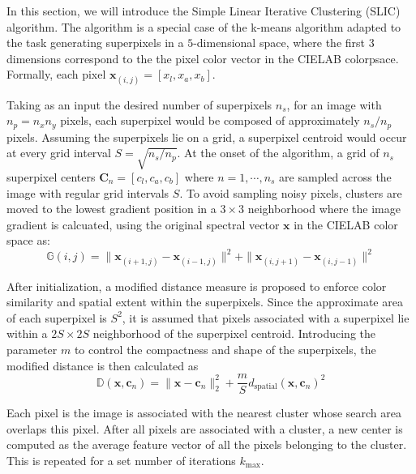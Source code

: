 In this section, we will introduce the Simple Linear Iterative Clustering (SLIC) algorithm. The algorithm is a special case of the k-means algorithm adapted to the task generating superpixels in a $5$-dimensional space, where the first $3$ dimensions correspond to the the pixel color vector in the CIELAB colorpsace. Formally, each pixel $\mathbf{x}_{(i,j)} = [x_l, x_a, x_b]$. 

Taking as an input the desired number of superpixels $n_s$, for an image with $n_p = n_x n_y$ pixels, each superpixel would be composed of approximately $n_s / n_p$ pixels. Assuming the superpixels lie on a grid, a superpixel centroid would occur at every grid interval $S = \sqrt{n_s/n_p}$. At the onset of the algorithm, a grid of $n_s$ superpixel centers $\mathbf{C}_n = [c_{l}, c_{a}, c_{b}]$ where $n = 1, \cdots, n_s$ are sampled across the image with regular grid intervals $S$. To avoid sampling noisy pixels, clusters are moved to the lowest gradient position in a $3 \times 3$ neighborhood where the image gradient is calcuated, using the original spectral vector $\mathbf{x}$ in the CIELAB color space as:
\begin{equation}
    \label{eq:slic-gradient}
    \mathbb{G}(i,j) = \|\mathbf{x}_{(i+1,j)} - \mathbf{x}_{(i-1,j)} \|^2 + \|\mathbf{x}_{(i,j+1)} - \mathbf{x}_{(i,j-1)} \|^2
\end{equation}

After initialization, a modified distance measure is proposed to enforce color similarity and spatial extent within the superpixels. Since the approximate area of each superpixel is $S^2$, it is assumed that pixels associated with a superpixel lie within a $2S \times 2S$ neighborhood of the superpixel centroid. Introducing the parameter $m$ to control the compactness and shape of the superpixels, the modified distance is then calculated as 
\begin{equation}
    \label{eq:slic-cielab-distance}
    \mathbb{D}(\mathbf{x}, \mathbf{c}_n) = \|\mathbf{x} - \mathbf{c}_n\|_2^2 + \frac{m}{S}d_{\text{spatial}}(\mathbf{x}, \mathbf{c}_n)^2
\end{equation}

Each pixel is the image is associated with the nearest cluster whose search area overlaps this pixel. After all pixels are associated with a cluster, a new center is computed as the average feature vector of all the pixels belonging to the cluster. This is repeated for a set number of iterations $k_\text{max}$. 

